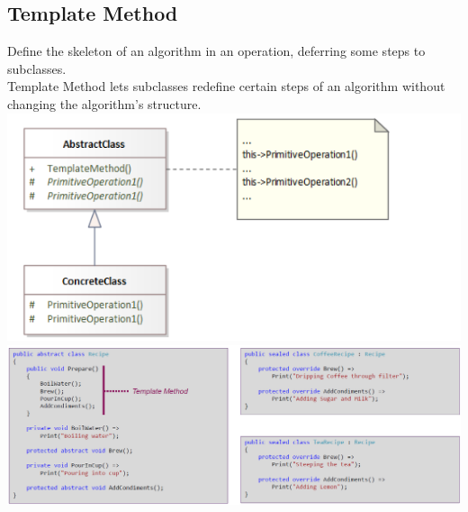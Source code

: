 \subsection{Template Method}
Define the skeleton of an algorithm in an operation, deferring some steps to subclasses.\\
Template Method lets subclasses redefine certain steps of an algorithm without changing the algorithm's structure.\\
\includegraphics[width=0.7\linewidth]{../img/template_method.png}
\includegraphics[width=\linewidth]{../img/template_method_code.png}



























